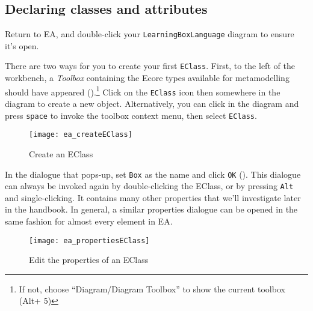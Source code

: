 \newpage
\subsection{Declaring classes and attributes}
\genHeader
\hypertarget{static:classes vis}{}

\begin{stepbystep}

\item\item  Return to EA, and double-click your \texttt{LearningBoxLanguage} diagram to ensure it's open.

\vspace{0.5cm}

\item\item  There are two ways for you to create your first \texttt{EClass}. First, to the left of the workbench, a \emph{Toolbox} containing
the Ecore types available for metamodelling should have appeared ().\footnote{If not, choose ``Diagram/Diagram Toolbox'' to show the
current toolbox (Alt+ 5)} Click on the \texttt{EClass} icon then somewhere in the diagram to create a new object. Alternatively, you can click in the diagram and press
\texttt{space} to invoke the toolbox context menu, then select \texttt{EClass}.

\vspace{0.5cm}

\begin{figure}[htbp]
	\centering
  \texttt{[image: ea\_createEClass]}
	\caption{Create an EClass}
	\label{ea:eclass}
\end{figure}

\vspace{0.5cm}

\item In the dialogue that pops-up, set \texttt{Box} as the name and click \texttt{OK} ().
This dialogue can always be invoked again by double-clicking the EClass, or by pressing \texttt{Alt} and single-clicking. It contains many other properties that we'll investigate later in the handbook. In general, a similar properties dialogue can be opened in the same fashion for almost every element in EA.

\clearpage

\begin{figure}[ht]
	\centering
  \texttt{[image: ea\_propertiesEClass]}
	\caption{Edit the properties of an EClass}
	\label{ea:eclass_properties}
\end{figure}


\end{stepbystep}
